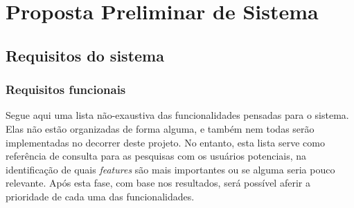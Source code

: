 \documentclass[a4paper]{abntex2}
\begin{document}
\chapter{Proposta Preliminar de Sistema}

\section{Requisitos do sistema}

\subsection{Requisitos funcionais}

Segue aqui uma lista não-exaustiva das funcionalidades pensadas para o sistema. Elas não estão organizadas de forma alguma, e também nem todas serão implementadas no decorrer deste projeto. No entanto, esta lista serve como referência de consulta para as pesquisas com os usuários potenciais, na identificação de quais \emph{features} são mais importantes ou se alguma seria pouco relevante. Após esta fase, com base nos resultados, será possível aferir a prioridade de cada uma das funcionalidades.
\end{document}
